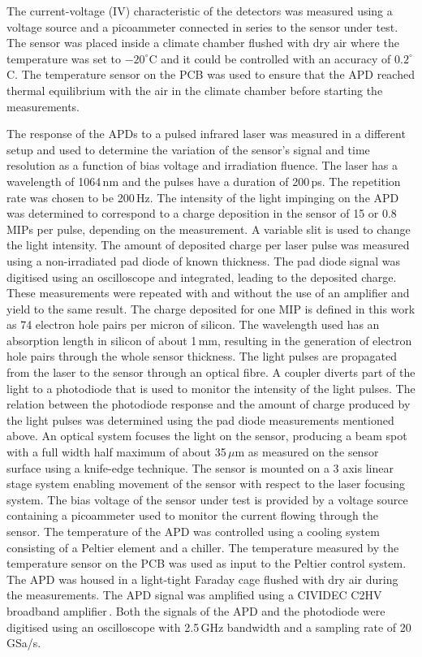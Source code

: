 \documentclass[review,number,sort&compress]{elsarticle}
\begin{document}
The current-voltage (IV) characteristic of the detectors was measured using a voltage source and a picoammeter connected in series to the sensor under test.
The sensor was placed inside a climate chamber flushed with dry air where the temperature was set to $-20^\circ$C and it could be controlled with an accuracy of $0.2^\circ$C.
The temperature sensor on the PCB was used to ensure that the APD reached thermal equilibrium with the air in the climate chamber before starting the measurements.

The response of the APDs to a pulsed infrared laser was measured in a different setup and used to determine the variation of the sensor's signal and time resolution as a function of bias voltage and irradiation fluence.
The laser has a wavelength of 1064\,nm and the pulses have a duration of 200\,ps.
The repetition rate was chosen to be 200\,Hz.
The intensity of the light impinging on the APD was determined to correspond to a charge deposition in the sensor of 15 or 0.8\,MIPs per pulse, depending on the measurement.
A variable slit is used to change the light intensity.
The amount of deposited charge per laser pulse was measured using a non-irradiated pad diode of known thickness.
The pad diode signal was digitised using an oscilloscope and integrated, leading to the deposited charge.
These measurements were repeated with and without the use of an amplifier and yield to the same result.
The charge deposited for one MIP is defined in this work as 74 electron hole pairs per micron of silicon.
The wavelength used has an absorption length in silicon of about 1\,mm, resulting in the generation of electron hole pairs through the whole sensor thickness.
The light pulses are propagated from the laser to the sensor through an optical fibre.
A coupler diverts part of the light to a photodiode that is used to monitor the intensity of the light pulses.
The relation between the photodiode response and the amount of charge produced by the light pulses was determined using the pad diode measurements mentioned above.
An optical system focuses the light on the sensor, producing a beam spot with a full width half maximum of about 35\,$\mu$m as measured on the sensor surface using a knife-edge technique.
The sensor is mounted on a 3 axis linear stage system enabling movement of the sensor with respect to the laser focusing system.
The bias voltage of the sensor under test is provided by a voltage source containing a picoammeter used to monitor the current flowing through the sensor.
The temperature of the APD was controlled using a cooling system consisting of a Peltier element and a chiller.
The temperature measured by the temperature sensor on the PCB was used as input to the Peltier control system.
The APD was housed in a light-tight Faraday cage flushed with dry air during the measurements.
The APD signal was amplified using a CIVIDEC C2HV broadband amplifier\,\cite{cividec}.
Both the signals of the APD and the photodiode were digitised using an oscilloscope with 2.5\,GHz bandwidth and a sampling rate of 20\,GSa/s.
\end{document}
